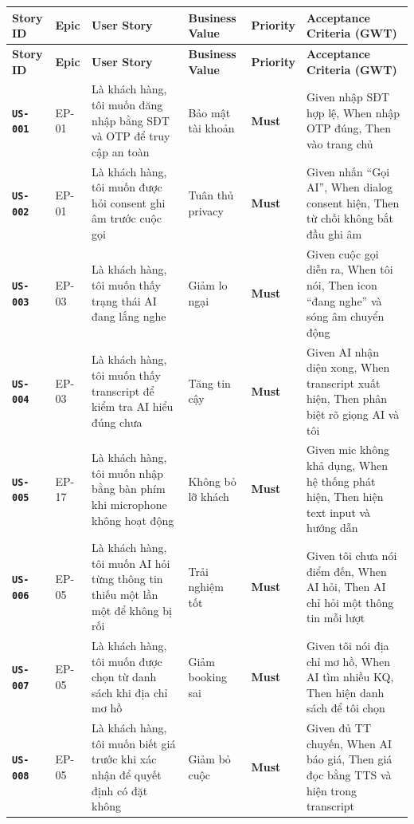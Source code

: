 \documentclass[12pt,a4paper]{article}
\newcommand{\storyid}[1]{\texttt{\textbf{\color{AloPurple}#1}}}
\newcommand{\musthave}{\colorbox{PrioMust}{\small\textbf{Must}}}
\begin{document}
\small
\begin{longtable}{L{1.5cm} L{1.5cm} L{3.5cm} L{3.5cm} C{1.5cm} L{4cm}}
  \toprule
  \textbf{Story ID}&\textbf{Epic}&\textbf{User Story}&\textbf{Business Value}&\textbf{Priority}&\textbf{Acceptance Criteria (GWT)}\\
  \midrule\endfirsthead
  \toprule{}\textbf{Story ID}&\textbf{Epic}&\textbf{User Story}&\textbf{Business Value}&\textbf{Priority}&\textbf{Acceptance Criteria (GWT)}\\
  \midrule\endhead\bottomrule\endlastfoot
  \storyid{US-001} & EP-01 & Là khách hàng, tôi muốn đăng nhập bằng SĐT và OTP để truy cập an toàn & Bảo mật tài khoản & \musthave & Given nhập SĐT hợp lệ, When nhập OTP đúng, Then vào trang chủ \\
  \storyid{US-002} & EP-01 & Là khách hàng, tôi muốn được hỏi consent ghi âm trước cuộc gọi & Tuân thủ privacy & \musthave & Given nhấn ``Gọi AI'', When dialog consent hiện, Then từ chối không bắt đầu ghi âm \\
  \storyid{US-003} & EP-03 & Là khách hàng, tôi muốn thấy trạng thái AI đang lắng nghe & Giảm lo ngại & \musthave & Given cuộc gọi diễn ra, When tôi nói, Then icon ``đang nghe'' và sóng âm chuyển động \\
  \storyid{US-004} & EP-03 & Là khách hàng, tôi muốn thấy transcript để kiểm tra AI hiểu đúng chưa & Tăng tin cậy & \musthave & Given AI nhận diện xong, When transcript xuất hiện, Then phân biệt rõ giọng AI và tôi \\
  \storyid{US-005} & EP-17 & Là khách hàng, tôi muốn nhập bằng bàn phím khi microphone không hoạt động & Không bỏ lỡ khách & \musthave & Given mic không khả dụng, When hệ thống phát hiện, Then hiện text input và hướng dẫn \\
  \storyid{US-006} & EP-05 & Là khách hàng, tôi muốn AI hỏi từng thông tin thiếu một lần một để không bị rối & Trải nghiệm tốt & \musthave & Given tôi chưa nói điểm đến, When AI hỏi, Then AI chỉ hỏi một thông tin mỗi lượt \\
  \storyid{US-007} & EP-05 & Là khách hàng, tôi muốn được chọn từ danh sách khi địa chỉ mơ hồ & Giảm booking sai & \musthave & Given tôi nói địa chỉ mơ hồ, When AI tìm nhiều KQ, Then hiện danh sách để tôi chọn \\
  \storyid{US-008} & EP-05 & Là khách hàng, tôi muốn biết giá trước khi xác nhận để quyết định có đặt không & Giảm bỏ cuộc & \musthave & Given đủ TT chuyến, When AI báo giá, Then giá đọc bằng TTS và hiện trong transcript \\

\end{longtable}
\end{document}
